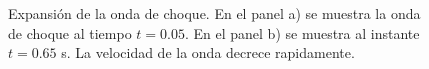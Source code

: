 \documentclass[12pt,a4paper]{book}
\begin{document}
\begin{figure} 	
\centering
{}
\caption{\label{fig:bwhll-rel-centrado}Expansión de la onda de choque. En el panel a) se muestra la onda de choque al tiempo $ t = 0.05$. En el panel b) se muestra al instante $t = 0.65$ s. La velocidad de la onda decrece rapidamente.} 
\end{figure}
\end{document}
